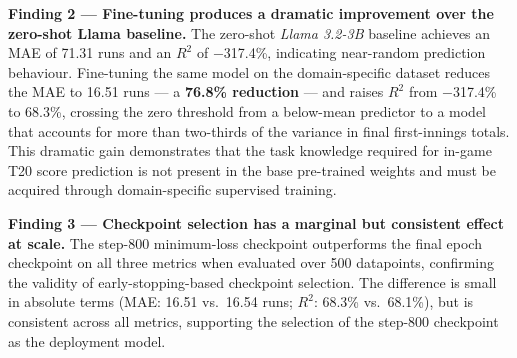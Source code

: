\textbf{Finding 2 — Fine-tuning produces a dramatic improvement over the zero-shot Llama baseline.} The zero-shot \textit{Llama 3.2-3B} baseline achieves an MAE of 71.31 runs and an $R^2$ of $-$317.4\%, indicating near-random prediction behaviour. Fine-tuning the same model on the domain-specific dataset reduces the MAE to 16.51 runs --- a \textbf{76.8\% reduction} --- and raises $R^2$ from $-$317.4\% to 68.3\%, crossing the zero threshold from a below-mean predictor to a model that accounts for more than two-thirds of the variance in final first-innings totals. This dramatic gain demonstrates that the task knowledge required for in-game T20 score prediction is not present in the base pre-trained weights and must be acquired through domain-specific supervised training.

\textbf{Finding 3 — Checkpoint selection has a marginal but consistent effect at scale.} The step-800 minimum-loss checkpoint outperforms the final epoch checkpoint on all three metrics when evaluated over 500 datapoints, confirming the validity of early-stopping-based checkpoint selection. The difference is small in absolute terms (MAE: 16.51 vs.\ 16.54 runs; $R^2$: 68.3\% vs.\ 68.1\%), but is consistent across all metrics, supporting the selection of the step-800 checkpoint as the deployment model.
